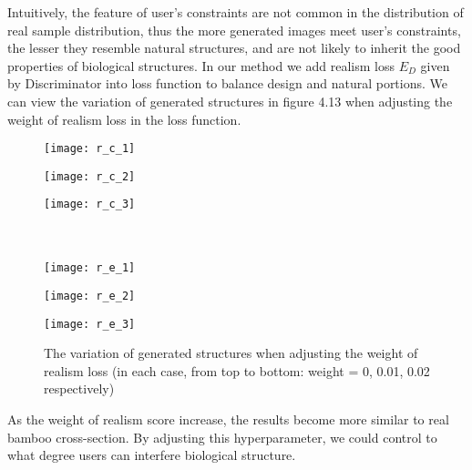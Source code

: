 Intuitively, the feature of user's constraints are not common in the distribution of real sample distribution, thus the more generated images meet user's constraints, the lesser they resemble natural structures, and are not likely to inherit the good properties of biological structures. In our method we add realism loss $E_D$ given by Discriminator into loss function to balance design and natural portions. We can view the variation of generated structures in figure 4.13 when adjusting the weight of realism loss in the loss function.
\begin{figure}
	\centering

		\begin{minipage}[b]{0.8\textwidth}
			\texttt{[image: r\_c\_1]}
		\end{minipage}

		\begin{minipage}[b]{0.8\textwidth}
			\texttt{[image: r\_c\_2]}
		\end{minipage}

		\begin{minipage}[b]{0.8\textwidth}
			\texttt{[image: r\_c\_3]}\\\\\\
		\end{minipage}

		\begin{minipage}[b]{0.8\textwidth}
			\texttt{[image: r\_e\_1]}
		\end{minipage}

		\begin{minipage}[b]{0.8\textwidth}
			\texttt{[image: r\_e\_2]}
		\end{minipage}

		\begin{minipage}[b]{0.8\textwidth}
			\texttt{[image: r\_e\_3]}
		\end{minipage}

	\caption{The variation of generated structures when adjusting the weight of realism loss (in each case, from top to bottom: weight = 0, 0.01, 0.02 respectively)} \label{fig:22}
\end{figure}

As the weight of realism score increase, the results become more similar to real bamboo cross-section. By adjusting this hyperparameter, we could control to what degree users can interfere biological structure.

